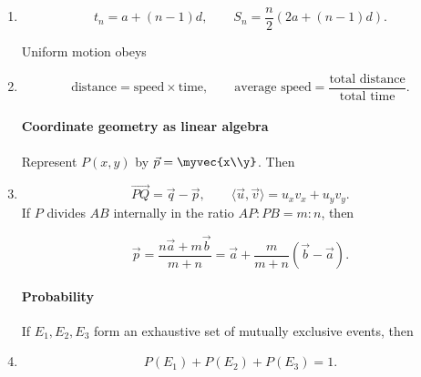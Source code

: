 \begin{enumerate}[label=\theenumi,leftmargin=4mm,itemsep=4pt]
\paragraph*{Arithmetic progressions}
For an arithmetic progression,
\setcounter{enumi}{10}\item

\begin{equation}
 t_n=a+(n-1)d,\qquad S_n=\frac n2\left(2a+(n-1)d\right).\label{eq:ap-question-11}
\end{equation}

Uniform motion obeys

\setcounter{enumi}{12}\item

\begin{equation}
\text{distance}=\text{speed}\times\text{time},\qquad
\text{average speed}=\frac{\text{total distance}}{\text{total time}}.
\label{eq:speed-time}
\end{equation}

\paragraph*{Coordinate geometry as linear algebra}
Represent $P(x,y)$ by $\vec p=\myvec{x\\y}$. Then

\setcounter{enumi}{13}\item

\begin{equation}
\overrightarrow{PQ}=\vec q-\vec p,\qquad
\langle\vec u,\vec v\rangle=u_xv_x+u_yv_y.
\label{eq:vector-basics}
\end{equation}
If $P$ divides $AB$ internally in the ratio $AP:PB=m:n$, then



\begin{equation}
\vec p=\frac{n\vec a+m\vec b}{m+n}=\vec a+\frac{m}{m+n}(\vec b-\vec a).
\label{eq:section-vector}
\end{equation}

\paragraph*{Probability}
If $E_1,E_2,E_3$ form an exhaustive set of mutually exclusive events, then
\setcounter{enumi}{14}\item

\begin{equation}
P(E_1)+P(E_2)+P(E_3)=1.\label{eq:three-events}
\end{equation}



\end{enumerate}
